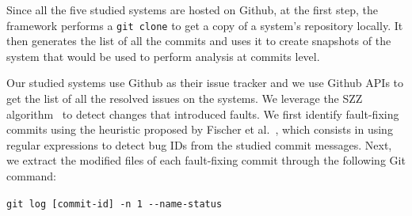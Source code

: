  Since all the five studied systems are hosted on Github, at the first step, the framework performs a \texttt{git clone} to get a copy of a system's repository locally. It then generates the list of all the commits and uses it to create snapshots of the system that would be used to perform analysis at commits level.

\begin{sloppypar}
 Our studied systems use Github as their issue tracker and we use Github APIs to get the list of all the resolved issues on the systems. We leverage the SZZ algorithm~\cite{sliwerski2005changes} to detect changes that introduced faults. We first identify fault-fixing commits using the heuristic proposed by Fischer et al.~\cite{fischer2003populating}, which consists in using regular expressions to detect bug IDs from the studied commit messages. Next, we extract the modified files of each fault-fixing commit through the following Git command:\\
\end{sloppypar}

\texttt{git log [commit-id] -n 1 {-{}-}name-status}\\

